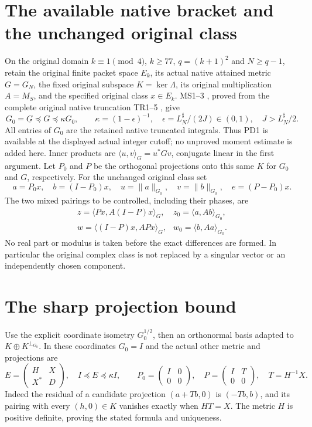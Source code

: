 \section{The available native bracket and the unchanged original class}
On the original domain $k\equiv1\pmod4$, $k\ge77$, $q=(k+1)^2$
and $N\ge q-1$, retain the original finite packet space $E_k$, its actual native attained
metric $G=G_N$, the fixed original subspace $K=\ker\Lambda$, its original
multiplication $A=M_S$, and the specified original class $x\in E_k$.
MS1--3 \cite{mproj:MS}, proved from the complete original native truncation
TR1--5 \cite{mproj:TR}, give
\[
 G_0=\underline G\preceq G\preceq\kappa G_0,\qquad
 \kappa=(1-\epsilon)^{-1},\quad
 \epsilon=L_N^\sharp/(2J)\in(0,1),\quad J>L_N^\sharp/2.          \tag{PD1}
\]
All entries of $G_0$ are the retained native truncated integrals.
Thus PD1 is available at the displayed actual integer cutoff; no
unproved moment estimate is added here.  Inner products are
$\langle u,v\rangle_G=u^*Gv$, conjugate linear in the first argument.
Let $P_0$ and $P$ be the orthogonal projections onto this same $K$
for $G_0$ and $G$, respectively.  For the unchanged original class set
\[
 a=P_0x,\quad b=(I-P_0)x,\quad
 u=\|a\|_{G_0},\quad v=\|b\|_{G_0},\quad
 e=(P-P_0)x.
                                                                    \tag{PD2}
\]
The two mixed pairings to be controlled, including their phases, are
\[
 \begin{array}{ll}
 z=\langle Px,A(I-P)x\rangle_G,
   &z_0=\langle a,Ab\rangle_{G_0},\\
 w=\langle(I-P)x,APx\rangle_G,
   &w_0=\langle b,Aa\rangle_{G_0}.
 \end{array}                                                       \tag{PD3}
\]
No real part or modulus is taken before the exact differences are
formed.  In particular the original complex class is not replaced
by a singular vector or an independently chosen component.

\section{The sharp projection bound}
Use the explicit coordinate isometry $G_0^{1/2}$, then an orthonormal
basis adapted to $K\oplus K^{\perp_{G_0}}$.  In these coordinates
$G_0=I$ and the actual other metric and projections are
\[
 E=\begin{pmatrix}H&X\\X^*&D\end{pmatrix},\quad I\preceq E\preceq\kappa I,
 \qquad P_0=\begin{pmatrix}I&0\\0&0\end{pmatrix},\quad
 P=\begin{pmatrix}I&T\\0&0\end{pmatrix},\quad T=H^{-1}X.          \tag{PD4}
\]
Indeed the residual of a candidate projection $(a+Tb,0)$ is
$(-Tb,b)$, and its pairing with every $(h,0)\in K$ vanishes exactly
when $HT=X$.  The metric $H$ is positive definite, proving the
stated formula and uniqueness.

